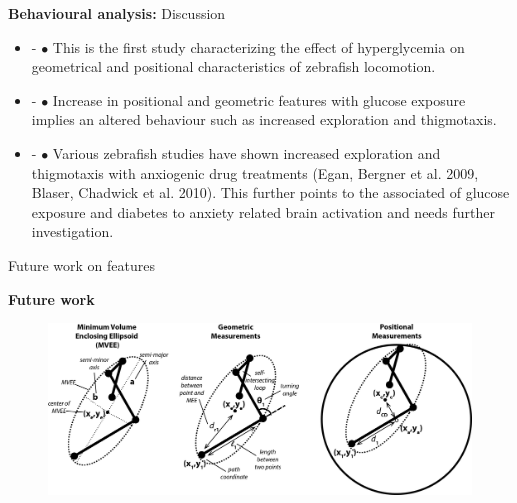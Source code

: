 \documentclass{beamer}
\newlength{\tmpShadow}
\newcommand{\MyShadow}[2]{%
	\settowidth{\tmpShadow}{#1}
	\addtolength{\tmpShadow}{.1em}
	\raisebox{-0.25ex}{\textcolor{gray!70}{#1}}%
	\kern-\tmpShadow%
	\textcolor{#2}{#1}%
}
\begin{document}
{\begin{frame}{\textbf{Behavioural analysis:} Discussion}
	\begin{itemize}
		\item<1->{\MyShadow{$\bullet$}{red!80}} This is the first study characterizing the effect of hyperglycemia on geometrical and positional characteristics of zebrafish locomotion.
		\item<2->{\MyShadow{$\bullet$}{red!80}} Increase in positional and geometric features with glucose exposure implies an altered behaviour such as increased exploration and thigmotaxis.
		\item<3->{\MyShadow{$\bullet$}{blue!80}} Various zebrafish studies have shown increased exploration and thigmotaxis with anxiogenic drug treatments (Egan, Bergner et al. 2009, Blaser, Chadwick et al. 2010).  This further points to the associated of glucose exposure and diabetes to anxiety related brain activation and needs further investigation.
	\end{itemize}
\end{frame}

\begin{frame}[plain,c]
	\vspace{1mm}
	\begin{center}
		\Huge Future work on features
	\end{center}
\end{frame}

\begin{frame}{\textbf{Future work}}
	\begin{figure}[H]
		\centering
		\includegraphics[width=\textwidth]{figures/pathfeatures1}
	\end{figure}	
\end{frame}

}
\end{document}
